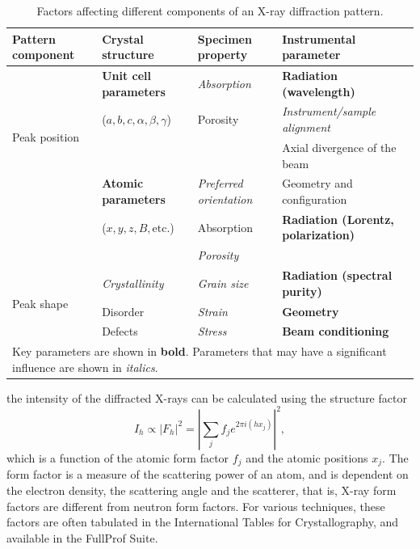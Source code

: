 \documentclass[aps,prb,twocolumn,superscriptaddress]{revtex4-2}
\begin{document}
\begin{table}[]
\caption{Factors affecting different components of an X-ray diffraction pattern.}
\label{tab:DiffractionFactors}
\centering
\begin{tabular}{llll}
\hline
Pattern component & Crystal structure & Specimen property & Instrumental parameter \\ \hline
\multirow{4}{*}{Peak position}  
  & \textbf{Unit cell parameters} & \textit{Absorption} & \textbf{Radiation (wavelength)} \\
  & ($a, b, c, \alpha, \beta, \gamma$) & Porosity & \textit{Instrument/sample alignment} \\
  & & & Axial divergence of the beam \\ \hline
\multirow{3}{*}{Peak intensity}  
  & \textbf{Atomic parameters} & \textit{Preferred orientation} & Geometry and configuration \\
  & ($x, y, z, B, \text{etc.}$) & Absorption & \textbf{Radiation (Lorentz, polarization)} \\
  & & \textit{Porosity} &  \\ \hline
\multirow{3}{*}{Peak shape}  
  & \textit{Crystallinity} & \textit{Grain size} & \textbf{Radiation (spectral purity)} \\
  & Disorder & \textit{Strain} & \textbf{Geometry} \\
  & Defects & \textit{Stress} & \textbf{Beam conditioning} \\ \hline
\multicolumn{4}{l}{Key parameters are shown in \textbf{bold}. Parameters that may have a significant influence are shown in \textit{italics}.} \\ \hline
\end{tabular}
\end{table}








the intensity of the diffracted X-rays can be calculated using the structure factor
\begin{equation}
    I_h \propto |F_h|^2 = \left| \sum_j f_j e^{2\pi i(hx_j)} \right|^2,
\end{equation}
which is a function of the atomic form factor $f_j$ and the atomic positions $x_j$.
The form factor is a measure of the scattering power of an atom, and is dependent on
the electron density, the scattering angle and the scatterer, that is, X-ray form 
factors are different from neutron form factors. For various techniques, these factors are often tabulated in
the International Tables for Crystallography, and available in the FullProf Suite.
\end{document}

